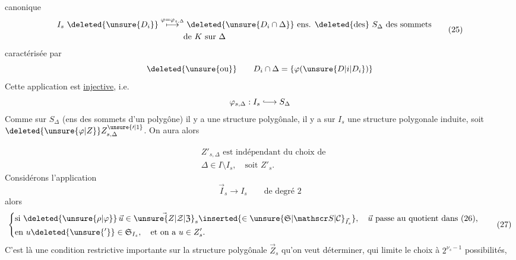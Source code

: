 canonique
\[\begin{aligned}
I_s\ \deleted{\unsure{D_i}}&\mathrel{\mathop{\longmapsto}\limits^{\varphi=\varphi_{s,\Delta}}}\deleted{\unsure{D_i\cap\Delta}}\ \text{ens. }\deleted{\text{des}}\ S_\Delta\text{ des sommets}\\
&\hspace{3em}\text{de }K\text{ sur }\Delta
\end{aligned}\tag*{(25)}\]
caractérisée par
\[\deleted{\unsure{\text{ou}}}\qquad D_i\cap\Delta=\{\varphi(\unsure{D|i|D_i})\}\]
Cette application est \uline{injective},  i.e.
\[\varphi_{s,\Delta}:I_s\lhook\joinrel\longrightarrow S_\Delta\]
Comme sur $S_\Delta$ (ens des sommets d'un polygône)
il y a une structure polygônale, il y a sur
$I_s$ une structure polygonale induite, 
soit $\deleted{\unsure{\varphi|Z}}Z_{s,\Delta}^{\unsure{\prime|1}}$. On aura alors

\[\begin{aligned} &Z'_{s,\Delta}\text{ est indépendant du choix de}\\
&\Delta\in I\setminus I_s,\quad\text{soit } Z'_s.
\end{aligned}\tag*{(A1)}\]
 Considérons l'application
\[\vec I_s\longrightarrow I_s\qquad\text{de degré }2\tag*{(26)}\]
 alors
\[\left\{\begin{aligned}
&\text{si }\deleted{\unsure{\rho|\varphi}}\,\vec u\in\vec{\unsure{Z|\mathcal Z|\mathfrak Z}}_s\inserted{\in{\unsure{\mathfrak S|\mathscr S|\mathcal C}}_{\vec I_s}},\quad\vec u\text{ passe au quotient dans (26),}\\
&\text{en }u\deleted{\unsure{'} }\in\mathfrak S_{I_s},\quad\text{et on a }u\in Z'_s.
\end{aligned}\right.\tag*{(27)}\]
C'est là une condition restrictive importante
sur la structure polygônale $\vec Z_s$ qu'on veut déterminer,
qui limite le choix à $2^{\nu_s-1}$ possibilités,
